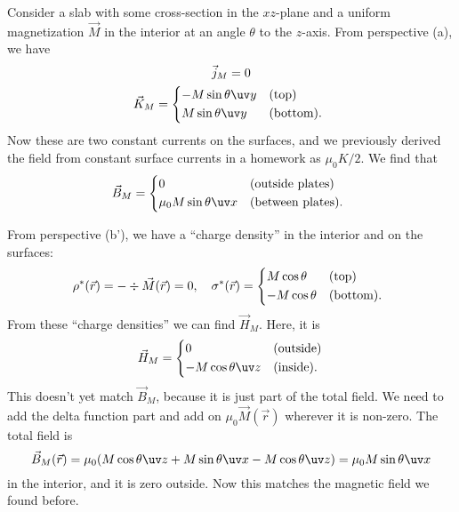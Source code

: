 \begin{exm}
    Consider a slab with some cross-section in the $xz$-plane and a uniform magnetization $\vec M$ in the interior at an angle $\theta$ to the $z$-axis. From perspective (a), we have
    \begin{gather}
        \vec j_M = 0\\
        \vec K_M = \begin{dcases*}
            -M\sin \theta \uv y & (top)\\
            M\sin \theta \uv y & (bottom).
        \end{dcases*}
    \end{gather}
    Now these are two constant currents on the surfaces, and we previously derived the field from constant surface currents in a homework as $\mu_0 K/2$. We find that
    \begin{equation}
        \vec B_M = \begin{dcases*}
            0 & (outside plates)\\
            \mu_0 M \sin\theta \uv x & (between plates).
        \end{dcases*}
    \end{equation}
    
    From perspective (b'), we have a ``charge density'' in the interior and on the surfaces:
    \begin{equation}
        \rho^*(\vec r) = -\div \vec M(\vec r) = 0, \quad \sigma^*(\vec r) = \begin{dcases*}
        M \cos\theta & (top)\\
        -M\cos\theta & (bottom).
        \end{dcases*}
    \end{equation}
    From these ``charge densities'' we can find $\vec H_M$. Here, it is
    \begin{equation}
        \vec H_M = \begin{dcases*}
            0 & (outside)\\
            -M \cos\theta \uv z & (inside).
        \end{dcases*}
    \end{equation}
    This doesn't yet match $\vec B_M$, because it is just part of the total field. We need to add the delta function part and add on $\mu_0 \vec M(\vec r)$ wherever it is non-zero. The total field is
    \begin{equation}
        \vec B_M(\vec r) = \mu_0(M\cos\theta \uv z + M \sin \theta \uv x - M\cos\theta \uv z)= \mu_0 M\sin\theta \uv x
    \end{equation}
    in the interior, and it is zero outside. Now this matches the magnetic field we found before.
\end{exm}

